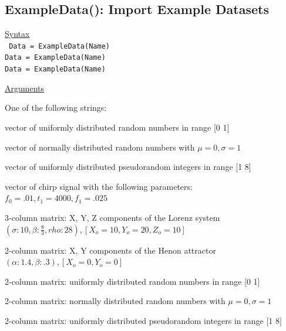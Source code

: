\documentclass[12pt, a4paper, titlepage, openany]{book}
\begin{document}
\subsection{\normalsize ExampleData():  Import Example Datasets} \label{ExampleData()}
\noindent\ul{Syntax} \vspace{6mm} \\ \noindent \texttt{\footnotesize
Data = ExampleData(Name)\\
Data = ExampleData(Name)\\
Data = ExampleData(Name)}

\noindent \ul{Arguments}
\begin{description}[labelsep=1cm, labelwidth=2cm, nosep,,style=multiline,leftmargin=3cm]\footnotesize
\item[\texttt{Name}]	One of the following strings:

\begin{description}[labelsep=1cm, labelwidth=4cm, nosep,style=multiline,leftmargin=4cm]\footnotesize
\item[\texttt{'uniform'}]	vector of uniformly distributed random numbers in range [0 1]
\item[\texttt{'gaussian'}]  vector of normally distributed random numbers with $\mu = 0, \sigma = 1$
\item[\texttt{'randintegers'}]  vector of uniformly distributed pseudorandom integers in range [1 8]
\item[\texttt{'chirp'}]   vector of chirp signal with the following parameters:\\
			    $f_0 = .01, t_1 = 4000, f_1 = .025$ \\
\item[\texttt{'lorenz'}] 3-column matrix: X, Y, Z components of the Lorenz system \\
$(\sigma: 10, \beta: \frac{8}{3}, rho: 28),   [X_o = 10, Y_o = 20, Z_o = 10]$
\item[\texttt{'henon'}] 2-column matrix: X, Y components of the Henon attractor 
	$(\alpha: 1.4, \beta: .3),   [X_o = 0, Y_o = 0] $ \\

\item[\texttt{'uniform2'}]    2-column matrix: uniformly distributed random numbers in range [0 1]
\item[\texttt{'gaussian2'}]   2-column matrix: normally distributed random numbers with $\mu = 0, \sigma = 1$
\item[\texttt{'randintegers2'}]  2-column matrix: uniformly distributed pseudorandom integers in range [1 8]\\


\end{description}
\end{description}
\end{document}
